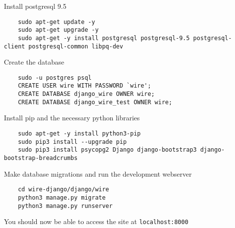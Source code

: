 Install postgresql 9.5
\begin{lstlisting}
    sudo apt-get update -y
    sudo apt-get upgrade -y
    sudo apt-get -y install postgresql postgresql-9.5 postgresql-client postgresql-common libpq-dev
\end{lstlisting}
Create the database
\begin{lstlisting}
    sudo -u postgres psql
    CREATE USER wire WITH PASSWORD `wire';
    CREATE DATABASE django_wire OWNER wire;
    CREATE DATABASE django_wire_test OWNER wire;
\end{lstlisting}
Install pip and the necessary python libraries
\begin{lstlisting}
    sudo apt-get -y install python3-pip
    sudo pip3 install --upgrade pip
    sudo pip3 install psycopg2 Django django-bootstrap3 django-bootstrap-breadcrumbs
\end{lstlisting}
Make database migrations and run the development webserver
\begin{lstlisting}
    cd wire-django/django/wire
    python3 manage.py migrate
    python3 manage.py runserver
\end{lstlisting}
You should now be able to access the site at \texttt{localhost:8000}
